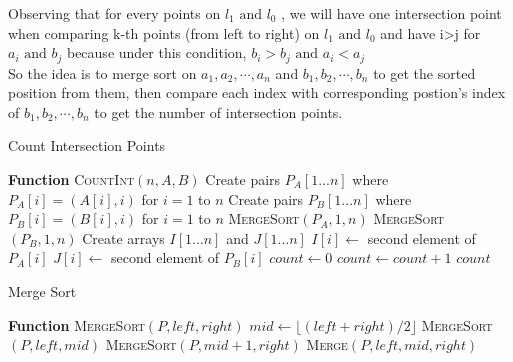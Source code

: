 \documentclass[letterpaper, 11pt]{article}
\newcommand{\1}{\mathds{1}}	%
\theoremstyle{definition}
\newenvironment{solution}{{\par\noindent\it Solution.}}{}
\begin{document}
\begin{solution}
Observing that for every points on $ l_1 \text{ and } l_0 $ , we will have one intersection point when comparing k-th points (from left to right) on $ l_1 \text{ and } l_0 $ and have i>j for $ a_i \text{ and } b_j $ because under this condition, $b_i>b_j \text{ and } a_i<a_j   $ 
\\So the idea is to merge sort on $ a_1,a_2,\cdots,a_n $ and $ b_1,b_2,\cdots,b_n $ to get the sorted position from them, then compare each index with corresponding postion's index of $ b_1,b_2,\cdots,b_n $ to get the number of intersection points.
\begin{algorithm}[H]
    \caption{Count Intersection Points}
    \begin{algorithmic}[1]
    \STATE \textbf{Function} \textsc{CountInt}$(n, A, B)$
    \STATE Create pairs $P_A[1...n]$ where $P_A[i] = (A[i], i)$ for $i = 1$ to $n$
    \STATE Create pairs $P_B[1...n]$ where $P_B[i] = (B[i], i)$ for $i = 1$ to $n$
    \STATE \textsc{MergeSort}$(P_A, 1, n)$ 
    \STATE \textsc{MergeSort}$(P_B, 1, n)$ 
    \STATE Create arrays $I[1...n]$ and $J[1...n]$
    \STATE $I[i] \gets $ second element of $P_A[i]$
    \STATE $J[i] \gets $ second element of $P_B[i]$
    \ENDFOR
    \STATE $count \gets 0$
    \STATE $count \gets count + 1$
    \ENDIF
    \ENDFOR
    \RETURN $count$
    \end{algorithmic}
    \end{algorithm}
    
    \begin{algorithm}[H]
    \caption{Merge Sort}
    \begin{algorithmic}[1]
    \STATE \textbf{Function} \textsc{MergeSort}$(P, left, right)$
    \STATE $mid \gets \lfloor(left + right)/2\rfloor$
    \STATE \textsc{MergeSort}$(P, left, mid)$
    \STATE \textsc{MergeSort}$(P, mid+1, right)$
    \STATE \textsc{Merge}$(P, left, mid, right)$
    \ENDIF
    \end{algorithmic}
    \end{algorithm}
    

\end{solution}
\end{document}
